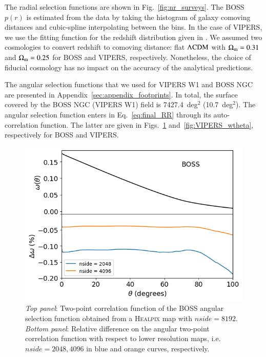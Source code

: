 \documentclass{aa}
\begin{document}
The radial selection functions are shown in Fig.~\ref{fig:nr_surveys}. The BOSS $p(r)$ is estimated from the data by taking the histogram of galaxy comoving distances and cubic-spline interpolating between the bins. In the case of VIPERS, we use the fitting function for the redshift distribution given in \cite{delatorre2013vipers}. 
We assumed two cosmologies to convert redshift to comoving distance: flat $\rm \Lambda CDM$ with $\Omega_{\rm m} = 0.31$ and $\Omega_{\rm m} = 0.25$ for BOSS and VIPERS, respectively. Nonetheless, the choice of fiducial cosmology has no impact on the accuracy of the analytical predictions.   

The angular selection functions that we used for VIPERS W1 and BOSS NGC are presented in Appendix~\ref{sec:appendix_footprints}. In total, the surface covered by the BOSS NGC (VIPERS W1) field is 7427.4~deg$^2$ (10.7~deg$^2$). The angular selection function enters in Eq.~\eqref{eq:final_RR} through its auto-correlation function. The latter are given in Figs.~\ref{fig:BOSS_wtheta} and~\ref{fig:VIPERS_wtheta}, respectively for BOSS and VIPERS.
%
\begin{figure}
\includegraphics[width=\columnwidth]{Figures/wtheta_boss_map_nside8192.png}
    \caption{\emph{Top panel}: Two-point correlation function of the BOSS angular selection function obtained from a \textsc{Healpix} map with $nside = 8192$. \emph{Bottom panel}: Relative difference on the angular two-point correlation function with respect to lower resolution maps, i.e. $nside = 2048, 4096$ in blue and orange curves, respectively.}
    \label{fig:BOSS_wtheta}
\end{figure}
%
\end{document}
